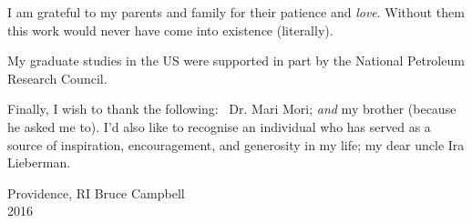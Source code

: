 \def\baselinestretch{1.0}
 I am grateful to my parents and family for their
patience and {\em love}. Without them this work would never have come into
existence (literally).

My graduate studies in the US were supported in part by the National
Petroleum Research Council.

\medskip
Finally, I wish to thank the following: \,  Dr. Mari Mori; {\em and } my
brother (because he asked me to).   I'd also like to recognise an individual
who has served as a source of inspiration, encouragement, and generosity in
my life; my dear uncle Ira Lieberman.

\bigskip\medskip

\noindent Providence, RI \hfill Bruce Campbell\\
2016

